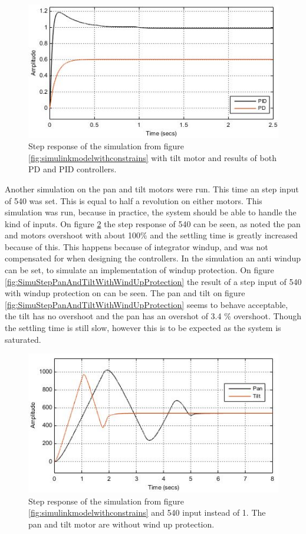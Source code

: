\begin{figure}[h!]
\centering
\includegraphics[scale=0.7]{Billeder/SimuStepTiltPDAndPID.jpg}
\caption{  Step response of the simulation from figure \ref{fig:simulinkmodelwithconstrains} with tilt motor and results of both PD and PID controllers.
 }
\label{fig:SimuStepTiltPDAndPID}
\end{figure}


Another simulation on the pan and tilt motors were run. This time an step input of 540 was set. This is equal to half a revolution on either motors. This simulation was run, because in practice,  the system should be able to handle the kind of inputs.
On figure \ref{fig:SimuStepPanAndTiltNoWindUpProtection} the step response of 540 can be seen, as noted the pan and motors overshoot with about 100\% and the settling time is greatly increased because of this. This happens because of integrator windup, and was not compensated for when designing the controllers. In the simulation an anti windup can be set, to simulate an implementation of windup protection. On figure \ref{fig:SimuStepPanAndTiltWithWindUpProtection} the result of a step input of 540 with windup protection on can be seen. The pan and tilt on figure \ref{fig:SimuStepPanAndTiltWithWindUpProtection} seems to behave acceptable, the tilt has no overshoot and the pan has an overshot of 3.4 \% overshoot. Though the settling time is still slow, however this is to be expected as the system is saturated.


\begin{figure}[h!]
\centering
\includegraphics[scale=0.7]{Billeder/SimuStepPanAndTiltNoWindUpProtection.jpg}
\caption{  Step response of the simulation from figure  \ref{fig:simulinkmodelwithconstrains} and 540 input instead of 1. The pan and tilt motor are without wind up protection. }
\label{fig:SimuStepPanAndTiltNoWindUpProtection}
\end{figure}


